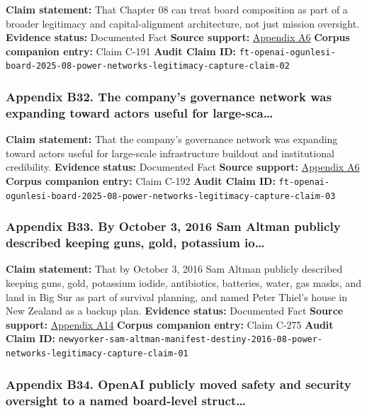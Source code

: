 \documentclass[
  american,
  11pt,
  letterpaper,
]{article}
\begin{document}
\textbf{Claim statement:} That Chapter 08 can treat board composition as
part of a broader legitimacy and capital-alignment architecture, not
just mission oversight. \textbf{Evidence status:} Documented Fact
\textbf{Source support:}
\hyperref[appendix-a6-openai-appoints-one-of-wall-street-s-most-powerful-dealmakers-to-its-board]{Appendix
A6} \textbf{Corpus companion entry:} Claim C-191 \textbf{Audit Claim
ID:}
\texttt{ft-openai-ogunlesi-board-2025-08-power-networks-legitimacy-capture-claim-02}

\subsubsection{Appendix B32. The company's governance network was
expanding toward actors useful for
large-sca\ldots{}}\label{appendix-b32-the-company-s-governance-network-was-expanding-toward-actors-useful-for-large-sca}

\textbf{Claim statement:} That the company's governance network was
expanding toward actors useful for large-scale infrastructure buildout
and institutional credibility. \textbf{Evidence status:} Documented Fact
\textbf{Source support:}
\hyperref[appendix-a6-openai-appoints-one-of-wall-street-s-most-powerful-dealmakers-to-its-board]{Appendix
A6} \textbf{Corpus companion entry:} Claim C-192 \textbf{Audit Claim
ID:}
\texttt{ft-openai-ogunlesi-board-2025-08-power-networks-legitimacy-capture-claim-03}

\subsubsection{Appendix B33. By October 3, 2016 Sam Altman publicly
described keeping guns, gold, potassium
io\ldots{}}\label{appendix-b33-by-october-3-2016-sam-altman-publicly-described-keeping-guns-gold-potassium-io}

\textbf{Claim statement:} That by October 3, 2016 Sam Altman publicly
described keeping guns, gold, potassium iodide, antibiotics, batteries,
water, gas masks, and land in Big Sur as part of survival planning, and
named Peter Thiel's house in New Zealand as a backup plan.
\textbf{Evidence status:} Documented Fact \textbf{Source support:}
\hyperref[appendix-a14-sam-altman-s-manifest-destiny]{Appendix A14}
\textbf{Corpus companion entry:} Claim C-275 \textbf{Audit Claim ID:}
\texttt{newyorker-sam-altman-manifest-destiny-2016-08-power-networks-legitimacy-capture-claim-01}

\subsubsection{Appendix B34. OpenAI publicly moved safety and security
oversight to a named board-level
struct\ldots{}}\label{appendix-b34-openai-publicly-moved-safety-and-security-oversight-to-a-named-board-level-struct}
\end{document}
